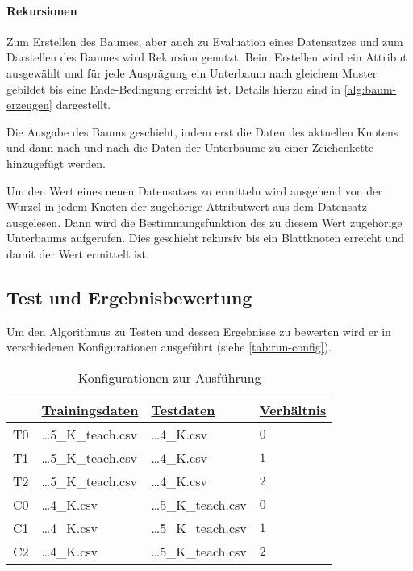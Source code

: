 \paragraph{Rekursionen}
Zum Erstellen des Baumes, aber auch zu Evaluation eines Datensatzes und zum Darstellen des Baumes wird Rekursion genutzt.
Beim Erstellen wird ein Attribut ausgewählt und für jede Ausprägung ein Unterbaum nach gleichem Muster gebildet bis eine Ende-Bedingung erreicht ist.
Details hierzu sind in \autoref{alg:baum-erzeugen} dargestellt.

Die Ausgabe des Baums geschieht,
indem erst die Daten des aktuellen Knotens und
dann nach und nach die Daten der Unterbäume zu einer Zeichenkette hinzugefügt werden.

Um den Wert eines neuen Datensatzes zu ermitteln wird ausgehend von der Wurzel in jedem Knoten der zugehörige Attributwert aus dem Datensatz ausgelesen.
Dann wird die Bestimmungsfunktion des zu diesem Wert zugehörige Unterbaums aufgerufen.
Dies geschieht rekursiv bis ein Blattknoten erreicht und damit der Wert ermittelt ist.

\subsection{Test und Ergebnisbewertung}
Um den Algorithmus zu Testen und dessen Ergebnisse zu bewerten wird er in verschiedenen Konfigurationen ausgeführt (siehe \autoref{tab:run-config}).


\useunder{\uline}{\ul}{}
\begin{table}[h]
    \begin{center}
        \begin{tabular}{|l|l|l|l|}
        \hline
                               & {\ul \textbf{Trainingsdaten}} & {\ul \textbf{Testdaten}}      & {\ul \textbf{Verhältnis}} \\
            \hline
            T0                  & \dots 5\_K\_teach.csv & \dots 4\_K.csv        & $0$ \\
            \hline
            T1                  & \dots 5\_K\_teach.csv & \dots 4\_K.csv        & $1$ \\
            \hline
            T2                  & \dots 5\_K\_teach.csv & \dots 4\_K.csv        & $2$ \\
            \hline
            \hline
            C0                  & \dots 4\_K.csv        & \dots 5\_K\_teach.csv & $0$ \\
            \hline
            C1                  & \dots 4\_K.csv        & \dots 5\_K\_teach.csv & $1$ \\
            \hline
            C2                  & \dots 4\_K.csv        & \dots 5\_K\_teach.csv & $2$ \\
            \hline
        \end{tabular}
        \caption{Konfigurationen zur Ausführung}
        \label{tab:run-config}
    \end{center}
\end{table}

